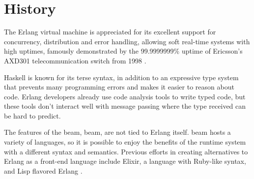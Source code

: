 

\section{History}

The Erlang virtual machine is appreciated for its excellent support for concurrency, distribution and error handling, allowing soft real-time systems with high uptimes, famously demonstrated by the 99.9999999\% uptime of Ericsson’s AXD301 telecommunication switch from 1998 \cite{ninenines}.

Haskell is known for its terse syntax, in addition to an expressive type system that prevents many programming errors and makes it easier to reason about code. Erlang developers already use code analysis tools to write typed code, but these tools don’t interact well with message passing where the type received can be hard to predict.

The features of the \gls{beam}, \glsdesc{beam}, are not tied to Erlang itself. \Gls{beam} hosts a variety of languages, so it is possible to enjoy the benefits of the runtime system with a different syntax and semantics. Previous efforts in creating alternatives to Erlang as a front-end language include Elixir\cite{elixir}, a language with Ruby-like syntax, and Lisp flavored Erlang \cite{lfe}.
